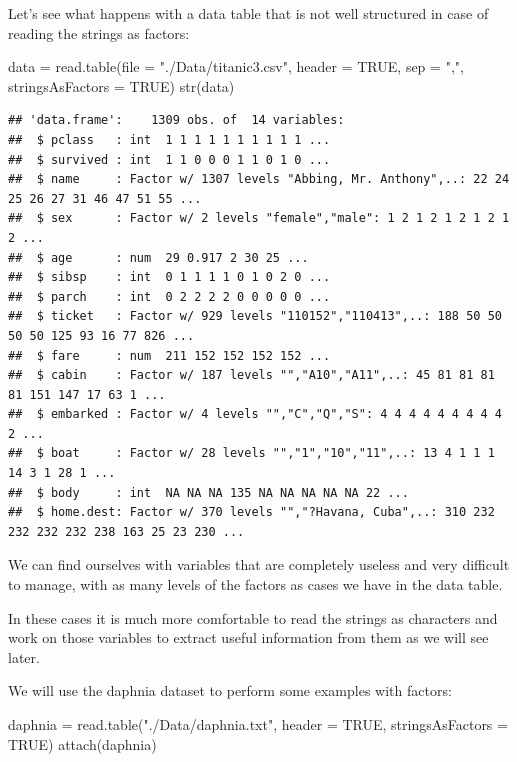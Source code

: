 \documentclass[
]{book}
\newenvironment{Shaded}{\begin{snugshade}}{\end{snugshade}}
\newcommand{\AttributeTok}[1]{\textcolor[rgb]{0.77,0.63,0.00}{#1}}
\newcommand{\ConstantTok}[1]{\textcolor[rgb]{0.00,0.00,0.00}{#1}}
\newcommand{\FunctionTok}[1]{\textcolor[rgb]{0.00,0.00,0.00}{#1}}
\newcommand{\NormalTok}[1]{#1}
\newcommand{\OtherTok}[1]{\textcolor[rgb]{0.56,0.35,0.01}{#1}}
\newcommand{\StringTok}[1]{\textcolor[rgb]{0.31,0.60,0.02}{#1}}
\theoremstyle{definition}
\theoremstyle{definition}
\theoremstyle{definition}
\theoremstyle{definition}
\theoremstyle{remark}
\begin{document}
Let's see what happens with a data table that is not well structured in case of reading the strings as factors:

\begin{Shaded}
\begin{Highlighting}[]
\NormalTok{data }\OtherTok{=} \FunctionTok{read.table}\NormalTok{(}\AttributeTok{file =} \StringTok{"./Data/titanic3.csv"}\NormalTok{, }\AttributeTok{header =} \ConstantTok{TRUE}\NormalTok{, }\AttributeTok{sep =} \StringTok{","}\NormalTok{, }\AttributeTok{stringsAsFactors =} \ConstantTok{TRUE}\NormalTok{)}
\FunctionTok{str}\NormalTok{(data)}
\end{Highlighting}
\end{Shaded}

\begin{verbatim}
## 'data.frame':    1309 obs. of  14 variables:
##  $ pclass   : int  1 1 1 1 1 1 1 1 1 1 ...
##  $ survived : int  1 1 0 0 0 1 1 0 1 0 ...
##  $ name     : Factor w/ 1307 levels "Abbing, Mr. Anthony",..: 22 24 25 26 27 31 46 47 51 55 ...
##  $ sex      : Factor w/ 2 levels "female","male": 1 2 1 2 1 2 1 2 1 2 ...
##  $ age      : num  29 0.917 2 30 25 ...
##  $ sibsp    : int  0 1 1 1 1 0 1 0 2 0 ...
##  $ parch    : int  0 2 2 2 2 0 0 0 0 0 ...
##  $ ticket   : Factor w/ 929 levels "110152","110413",..: 188 50 50 50 50 125 93 16 77 826 ...
##  $ fare     : num  211 152 152 152 152 ...
##  $ cabin    : Factor w/ 187 levels "","A10","A11",..: 45 81 81 81 81 151 147 17 63 1 ...
##  $ embarked : Factor w/ 4 levels "","C","Q","S": 4 4 4 4 4 4 4 4 4 2 ...
##  $ boat     : Factor w/ 28 levels "","1","10","11",..: 13 4 1 1 1 14 3 1 28 1 ...
##  $ body     : int  NA NA NA 135 NA NA NA NA NA 22 ...
##  $ home.dest: Factor w/ 370 levels "","?Havana, Cuba",..: 310 232 232 232 232 238 163 25 23 230 ...
\end{verbatim}

We can find ourselves with variables that are completely useless and very difficult to manage, with as many levels of the factors as cases we have in the data table.

In these cases it is much more comfortable to read the strings as characters and work on those variables to extract useful information from them as we will see later.

We will use the daphnia dataset to perform some examples with factors:

\begin{Shaded}
\begin{Highlighting}[]
\NormalTok{daphnia }\OtherTok{=} \FunctionTok{read.table}\NormalTok{(}\StringTok{"./Data/daphnia.txt"}\NormalTok{, }\AttributeTok{header =} \ConstantTok{TRUE}\NormalTok{, }\AttributeTok{stringsAsFactors =} \ConstantTok{TRUE}\NormalTok{)}
\FunctionTok{attach}\NormalTok{(daphnia)}
\end{Highlighting}
\end{Shaded}
\end{document}
